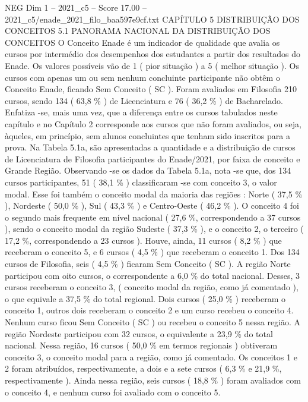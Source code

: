 \begin{textsample}{NEG Dim 1 – 2021\_c5 – Score 17.00 – 2021\_c5/enade\_2021\_filo\_baa597e9cf.txt}  \label{ex:f1_neg_409}
CAPÍTULO 5 DISTRIBUIÇÃO DOS CONCEITOS 5.1 PANORAMA NACIONAL DA DISTRIBUIÇÃO DOS CONCEITOS O Conceito Enade é um indicador de qualidade que avalia os cursos por intermédio dos desempenhos dos estudantes a partir dos resultados do Enade.
Os valores possíveis vão de 1 ( pior situação ) a 5 ( melhor situação ).
Os cursos com apenas um ou sem nenhum concluinte participante não obtêm o Conceito Enade, ficando Sem Conceito ( SC ).
Foram avaliados em Filosofia 210 cursos, sendo 134 ( 63,8 \% ) de Licenciatura e 76 ( 36,2 \% ) de Bacharelado.
Enfatiza -se, mais uma vez, que a diferença entre os cursos tabulados neste capítulo e no Capítulo 2 corresponde aos cursos que não foram avaliados, ou seja, àqueles, em princípio, sem alunos concluintes que tenham sido inscritos para a prova.
Na Tabela 5.1a, são apresentadas a quantidade e a distribuição de cursos de Licenciatura de Filosofia participantes do Enade/2021, por faixa de conceito e Grande Região.
Observando -se os dados da Tabela 5.1a, nota -se que, dos 134 cursos participantes, 51 ( 38,1 \% ) classificaram -se com conceito 3, o valor modal.
Esse foi também o conceito modal da maioria das regiões : Norte ( 37,5 \% ), Nordeste ( 50,0 \% ), Sul ( 43,3 \% ) e Centro-Oeste ( 46,2 \% ).
O conceito 4 foi o segundo mais frequente em nível nacional ( 27,6 \%, correspondendo a 37 cursos ), sendo o conceito modal da região Sudeste ( 37,3 \% ), e o conceito 2, o terceiro ( 17,2 \%, correspondendo a 23 cursos ).
Houve, ainda, 11 cursos ( 8,2 \% ) que receberam o conceito 5, e 6 cursos ( 4,5 \% ) que receberam o conceito 1.
Dos 134 cursos de Filosofia, seis ( 4,5 \% ) ficaram Sem Conceito ( SC ).
A região Norte participou com oito cursos, o correspondente a 6,0 \% do total nacional.
Desses, 3 cursos receberam o conceito 3, ( conceito modal da região, como já comentado ), o que equivale a 37,5 \% do total regional.
Dois cursos ( 25,0 \% ) receberam o conceito 1, outros dois receberam o conceito 2 e um curso recebeu o conceito 4.
Nenhum curso ficou Sem Conceito ( SC ) ou recebeu o conceito 5 nessa região.
A região Nordeste participou com 32 cursos, o equivalente a 23,9 \% do total nacional.
Nessa região, 16 cursos ( 50,0 \% em termos regionais ) obtiveram conceito 3, o conceito modal para a região, como já comentado.
Os conceitos 1 e 2 foram atribuídos, respectivamente, a dois e a sete cursos ( 6,3 \% e 21,9 \%, respectivamente ).
Ainda nessa região, seis cursos ( 18,8 \% ) foram avaliados com o conceito 4, e nenhum curso foi avaliado com o conceito 5.

\end{textsample}
